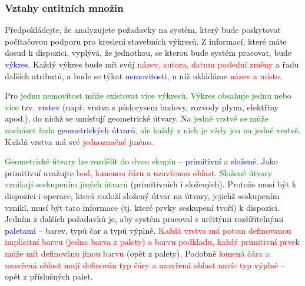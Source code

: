 \documentclass{beamer}
\begin{document}
  \begin{frame}
      \frametitle{Vztahy entitních množin}
      \scriptsize{
      \hspace{0.5cm}Předpokládejte, že analyzujete požadavky na systém, který bude poskytovat počítačovou
      podporu pro kreslení stavebních výkresů. Z informací, které máte dosud k dispozici,
      vyplývá, že jednotkou, se kterou bude systém pracovat, bude \textcolor{blue}{výkres}. Každý výkres bude
      mít svůj \textcolor{red}{název, autora, datum poslední změny} a řadu dalších atributů, a bude se týkat
      \textcolor{blue}{nemovitosti}, u níž ukládáme \textcolor{red}{název a místo}.\par


      \hspace{0.5cm}Pro \textcolor{green}{jednu nemovitost může existovat více výkresů}. \textcolor{green}{Výkres obsahuje jednu nebo více} tzv.
      \textcolor{blue}{vrstev} (např. vrstva s půdorysem budovy, rozvody plynu, elektřiny apod.), do nichž se
      umísťují geometrické útvary. Na \textcolor{green}{jedné vrstvě se může nacházet řada \textcolor{blue}{geometrických útvarů},
      ale každý z nich je vždy jen na} \textcolor{green}{jedné vrstvě}. Každá vrstva má své \textcolor{red}{jednoznačné jméno}.\par


      \hspace{0.5cm}\textcolor{green}{Geometrické útvary lze rozdělit do dvou skupin} -- \textcolor{blue}{primitivní} a \textcolor{blue}{složené}. Jako primitivní
      uvažujte \textcolor{red}{bod, lomenou čáru a uzavřenou oblast}. \textcolor{green}{Složené útvary vznikají seskupením jiných
      útvarů} (primitivních i složených). Protože musí být k dispozici i operace, která rozloží
      složený útvar na útvary, jejichž seskupením vznikl, musí být tato informace (tj. které
      prvky seskupení tvoří) k dispozici. Jedním z dalších požadavků je, aby systém pracoval
      s určitými rozšířitelnými \textcolor{blue}{paletami} -- barev, typů čar a typů výplně. \textcolor{red}{Každá vrstva má
      potom definovanou \textcolor{red}{implicitní barvu} (jedna barva  z  palety) a barvu podkladu, každý
      primitivní prvek může mít definovánu jinou barvu} (opět z palety). Podobně \textcolor{red}{lomená čára
      a uzavřená oblast mají definován typ čáry a uzavřená oblast navíc typ výplně} – opět
      z příslušných palet.\par}
  \end{frame}
\end{document}

